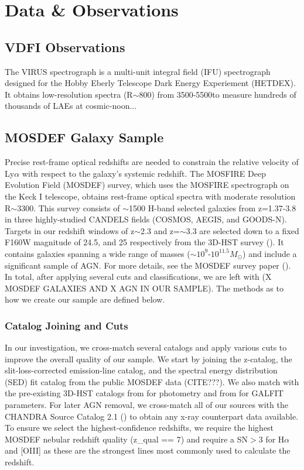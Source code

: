 \documentclass[linenumbers,amsmath,trackchanges,preprint2]{aastex702}
\begin{document}
\section{Data \& Observations}
\subsection{VDFI Observations}
\par The VIRUS spectrograph is a multi-unit integral field (IFU) spectrograph designed for the Hobby Eberly Telescope Dark Energy Experiement (HETDEX). It obtains low-resolution spectra (R$\sim$800) from 3500-5500\Ang to measure hundreds of thousands of LAEs at cosmic-noon...

\subsection{MOSDEF Galaxy Sample}
\par Precise rest-frame optical redshifts are needed to constrain the relative velocity of Ly$\alpha$ with respect to the galaxy's systemic redshift. The MOSFIRE Deep Evolution Field (MOSDEF) survey, which uses the MOSFIRE spectrograph on the Keck I telescope, obtains rest-frame optical spectra with moderate resolution R$\sim$3300. This survey consists of $\sim$1500 H-band selected galaxies from z=1.37-3.8 in three highly-studied CANDELS fields (COSMOS, AEGIS, and GOODS-N). Targets in our redshift windows of z$\sim$2.3 and z=$\sim$3.3 are selected down to a fixed F160W magnitude of 24.5, and 25 respectively from the 3D-HST survey (\cite{skelton2014}). It contains galaxies spanning a wide range of masses ($\sim$$10^9$-$10^{11.5}M_{\odot}$) and include a significant sample of AGN. For more details, see the MOSDEF survey paper (\cite{kriek2015}). In total, after applying several cuts and classifications, we are left with (X MOSDEF GALAXIES AND X AGN IN OUR SAMPLE). The methods as to how we create our sample are defined below.
\subsubsection{Catalog Joining and Cuts}
\par In our investigation, we cross-match several catalogs and apply various cuts to improve the overall quality of our sample. We start by joining the z-catalog, the slit-loss-corrected emission-line catalog, and the spectral energy distribution (SED) fit catalog from the public MOSDEF data (CITE???). We also match with the pre-existing 3D-HST catalogs from \cite{skelton2014} for photometry and from \cite{vanderWel2014} for GALFIT parameters. For later AGN removal, we cross-match all of our sources with the CHANDRA Source Catalog 2.1 (\cite{?}) to obtain any x-ray counterpart data available. To ensure we select the highest-confidence redshifts, we require the highest MOSDEF nebular redshift quality (z\_qual == 7) and require a SN$>3$ for H$\alpha$ and [OIII] as these are the strongest lines most commonly used to calculate the redshift.
\end{document}
